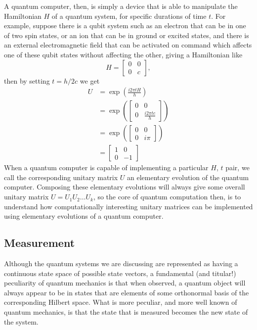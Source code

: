 A quantum computer, then, is simply a device that is able to manipulate the Hamiltonian $H$ of a quantum system, for specific durations of time $t$. For example, suppose there is a qubit system such as an electron that can be in one of two spin states, or an ion that can be in ground or excited states, and there is an external electromagnetic field that can be activated on command which affects one of these qubit states without affecting the other, giving a Hamiltonian like
\[H = \begin{bmatrix}
0 & 0 \\ 0 & c
\end{bmatrix},\]
then by setting $t = h/2c$ we get
\begin{align*}
U &= \exp\left(\frac{i 2\pi tH}{h}\right)
\\&= \exp\left(\begin{bmatrix}
0 & 0 \\
0 & \frac{i 2\pi tc}{h}
\end{bmatrix}\right)
\\&= \exp\left(\begin{bmatrix}
0 & 0 \\
0 & i\pi
\end{bmatrix}\right)
\\&= \begin{bmatrix}
1 & 0 \\
0 & -1
\end{bmatrix}
\end{align*}
When a quantum computer is capable of implementing a particular $H$, $t$ pair, we call the corresponding unitary matrix $U$ an elementary evolution of the quantum computer. Composing these elementary evolutions will always give some overall unitary matrix $U = U_1U_2\dots U_k$, so the core of quantum computation then, is to understand how computationally interesting unitary matrices can be implemented using elementary evolutions of a quantum computer.
\subsection{Measurement}
Although the quantum systems we are discussing are represented as having a continuous state space of possible state vectors, a fundamental (and titular!) peculiarity of quantum mechanics is that when observed, a quantum object will always appear to be in states that are elements of some orthonormal basis of the corresponding Hilbert space. What is more peculiar, and more well known of quantum mechanics, is that the state that is measured becomes the new state of the system.

